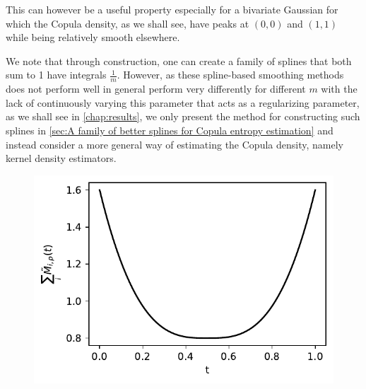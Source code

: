 \documentclass[../Thesis.tex]{subfiles}
\begin{document}
This can however be a useful property especially for a bivariate Gaussian for which the Copula density, as we shall see, have peaks at $(0,0)$ and $(1,1)$ while being relatively smooth elsewhere.

We note that through construction, one can create a family of splines that both sum to 1 have integrals $\frac{1}{m}$. However, as these spline-based smoothing methods does not perform well in general perform very differently for different $m$ with the lack of continuously varying this parameter that acts as a regularizing parameter, as we shall see in \autoref{chap:results}, we only present the method for constructing such splines in \autoref{sec:A family of better splines for Copula entropy estimation} and instead consider a more general way of estimating the Copula density, namely kernel density estimators.

\begin{figure}[h]
    \centering
    \includegraphics[width = .55\linewidth]{figures/MI estimation/M-spline coefficient sum - degree 3.pdf}
    \caption{}
    \label{fig:M-spline functions sum}
\end{figure}









\newpage
\end{document}
